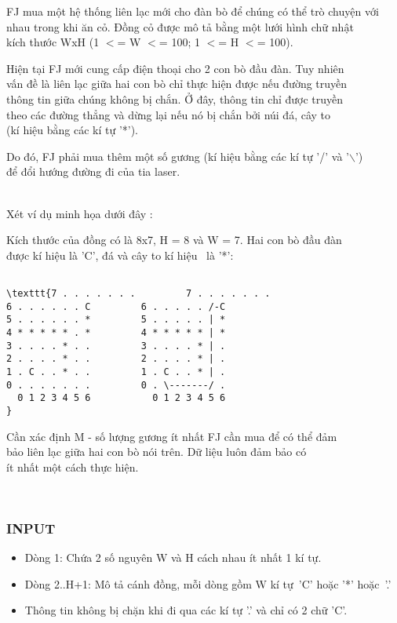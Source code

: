 

FJ mua một hệ thống liên lạc mới cho đàn bò để chúng có thể trò chuyện với
\\nhau trong khi ăn cỏ. Đồng cỏ được mô tả bằng một lưới hình chữ nhật
\\kích thước WxH (1 $<$= W $<$= 100; 1 $<$= H $<$= 100). 

Hiện tại FJ mới cung cấp điện thoại cho 2 con bò đầu đàn. Tuy nhiên
\\vấn đề là liên lạc giữa hai con bò chỉ thực hiện được nếu đường truyền
\\thông tin giữa chúng không bị chắn. Ở đây, thông tin chỉ được truyền
\\theo các đường thẳng và dừng lại nếu nó bị chắn bởi núi đá, cây to
\\(kí hiệu bằng các kí tự '*'). 

Do đó, FJ phải mua thêm một số gương (kí hiệu bằng các kí tự '/' và '$\backslash$')
\\để đổi hướng đường đi của tia laser.


\\Xét ví dụ minh họa dưới đây : 

Kích thước của đồng có là 8x7, H = 8 và W = 7. Hai con bò đầu đàn
\\được kí hiệu là 'C', đá và cây to kí hiệu  là '*':
\begin{verbatim}

\texttt{7 . . . . . . .         7 . . . . . . .
6 . . . . . . C         6 . . . . . /-C
5 . . . . . . *         5 . . . . . | *
4 * * * * * . *         4 * * * * * | *
3 . . . . * . .         3 . . . . * | .
2 . . . . * . .         2 . . . . * | .
1 . C . . * . .         1 . C . . * | .
0 . . . . . . .         0 . \-------/ .
  0 1 2 3 4 5 6           0 1 2 3 4 5 6
}\end{verbatim}

Cần xác định M - số lượng gương ít nhất FJ cần mua để có thể đảm
\\bảo liên lạc giữa hai con bò nói trên. Dữ liệu luôn đảm bảo có
\\ít nhất một cách thực hiện.

 

\subsubsection{INPUT}
\begin{itemize}
	\item 

Dòng 1: Chứa 2 số nguyên W và H cách nhau ít nhất 1 kí tự.
	\item 

Dòng 2..H+1: Mô tả cánh đồng, mỗi dòng gồm W kí tự 'C' hoặc '*' hoặc '.'
	\item 

Thông tin không bị chặn khi đi qua các kí tự '.' và chỉ có 2 chữ 'C'.
\end{itemize}

